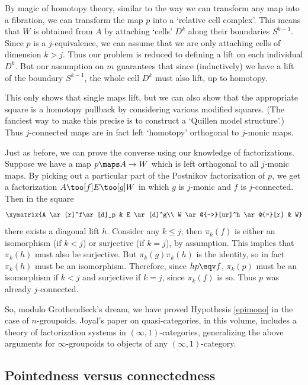 \documentclass{amsart}
\begin{document}
By magic of homotopy theory, similar to the way we can transform any
map into a fibration, we can transform the map $p$ into a `relative
cell complex'.  This means that $W$ is obtained from $A$ by attaching
`cells' $D^k$ along their boundaries $S^{k-1}$.  Since $p$ is a
$j$-equivalence, we can assume that we are only attaching cells of
dimension $k>j$.  Thus our problem is reduced to defining a lift on
each individual $D^k$.  But our assumption on $m$ guarantees that
since (inductively) we have a lift of the boundary $S^{k-1}$, the
whole cell $D^k$ must also lift, up to homotopy.

This only shows that single maps lift, but we can also show that the
appropriate square is a homotopy pullback by considering various
modified squares.  (The fanciest way to make this precise is to
construct a `Quillen model structure'.)  Thus $j$-connected maps are
in fact left `homotopy' orthogonal to $j$-monic maps.

Just as before, we can prove the converse using our knowledge of
factorizations.  Suppose we have a map $p\maps A\to W$ which is left
orthogonal to all $j$-monic maps.  By picking out a particular part of
the Postnikov factorization of $p$, we get a factorization $A\too[f]
E\too[g] W$ in which $g$ is $j$-monic and $f$ is $j$-connected.  Then
in the square
\[\xymatrix{A \ar[r]^f\ar[d]_p & E \ar[d]^g\\
  W \ar@{-->}[ur]^h \ar@{=}[r] & W}\]
there exists a diagonal lift $h$.  Consider any $k\le j$; then
$\pi_k(f)$ is either an isomorphism (if $k< j$) or surjective (if
$k=j$), by assumption.  This implies that $\pi_k(h)$ must also be
surjective.  But $\pi_k(g)\pi_k(h)$ is the identity, so in fact
$\pi_k(h)$ must be an isomorphism.  Therefore, since $hp\eqv f$,
$\pi_k(p)$ must be an isomorphism if $k<j$ and surjective if $k=j$,
since $\pi_k(f)$ is so.  Thus $p$ was already $j$-connected.

So, modulo Grothendieck's dream, we have proved
Hypothesis \ref{epimono} in the case of $n$-groupoids.
Joyal's paper on quasi-categories, in this volume, includes a theory
of factorization systems in $(\infty,1)$-categories, generalizing the
above arguments for $\infty$-groupoids to objects of any
$(\infty,1)$-category.

\subsection{Pointedness versus connectedness}
\label{sec:pointed-vs-connected}
\end{document}
